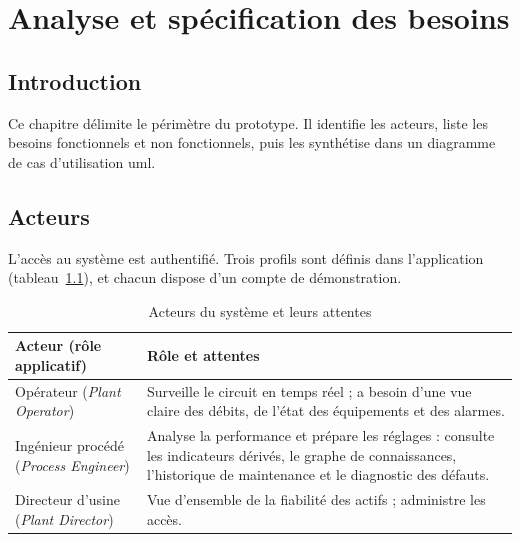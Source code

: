 \chapter{Analyse et spécification des besoins}
\label{chap:besoins}

\section{Introduction}
Ce chapitre délimite le périmètre du prototype. Il identifie les acteurs, liste les besoins fonctionnels et non fonctionnels, puis les synthétise dans un diagramme de cas d'utilisation \gls{uml}.

\section{Acteurs}
L'accès au système est authentifié. Trois profils sont définis dans l'application (tableau~\ref{tab:acteurs}), et chacun dispose d'un compte de démonstration.

\begin{table}[H]
\centering
\caption{Acteurs du système et leurs attentes}
\label{tab:acteurs}
\begin{tabularx}{\textwidth}{l X}
\toprule
\textbf{Acteur (rôle applicatif)} & \textbf{Rôle et attentes} \\
\midrule
Opérateur (\textit{Plant Operator}) & Surveille le circuit en temps réel ; a besoin d'une vue claire des débits, de l'état des équipements et des alarmes. \\
Ingénieur procédé (\textit{Process Engineer}) & Analyse la performance et prépare les réglages : consulte les indicateurs dérivés, le graphe de connaissances, l'historique de maintenance et le diagnostic des défauts. \\
Directeur d'usine (\textit{Plant Director}) & Vue d'ensemble de la fiabilité des actifs ; administre les accès. \\
\bottomrule
\end{tabularx}
\end{table}

